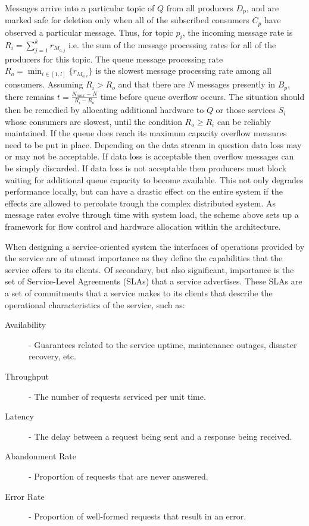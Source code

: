 Messages arrive into a particular topic of $Q$ from all producers $D_p$, and are marked safe for deletion only when all of the subscribed consumers $C_p$ have observed a particular message. Thus, for topic $p_i$, the incoming message rate is $\displaystyle R_i = \sum_{j=1}^k r_{M_{o,j}}$ i.e. the sum of the message processing rates for all of the producers for this topic. The queue message processing rate $\displaystyle R_o = \min_{i \in [1,l]}\{r_{M_{o,i}}\}$ is the slowest message processing rate among all consumers. Assuming $R_i > R_o$ and that there are $N$ messages presently in $B_p$, there remains $t = \frac{N_{max} - N} {R_i - R_o}$ time before queue overflow occurs. The situation should then be remedied by allocating additional hardware to $Q$ or those services $S_i$ whose consumers are slowest, until the condition $R_o \ge R_i$ can be reliably maintained. If the queue does reach its maximum capacity overflow measures need to be put in place. Depending on the data stream in question data loss may or may not be acceptable. If data loss is acceptable then overflow messages can be simply discarded. If data loss is not acceptable then producers must block waiting for additional queue capacity to become available. This not only degrades performance locally, but can have a drastic effect on the entire system if the effects are allowed to percolate trough the complex distributed system. As message rates evolve through time with system load, the scheme above sets up a framework for flow control and hardware allocation within the architecture.

When designing a service-oriented system the interfaces of operations provided by the service are of utmost importance as they define the capabilities that the service offers to its clients. Of secondary, but also significant, importance is the set of Service-Level Agreements (SLAs)\autocite{wieder2011service} that a service advertises. These SLAs are a set of commitments that a service makes to its clients that describe the operational characteristics of the service, such as:

\begin{description}
    \item [Availability] - Guarantees related to the service uptime, maintenance outages, disaster recovery, etc.
    \item [Throughput] - The number of requests serviced per unit time.
    \item [Latency] - The delay between a request being sent and a response being received.
    \item [Abandonment Rate] - Proportion of requests that are never answered.
    \item [Error Rate] - Proportion of well-formed requests that result in an error.
\end{description}

